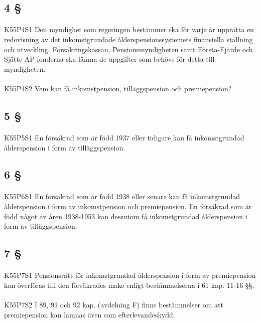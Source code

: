 \documentclass[a4paper,notitlepage,openany,10pt]{book}
\begin{document}
\subsection*{4 §}
\paragraph*{}
{\tiny K55P4S1}
Den myndighet som regeringen bestämmer ska för varje år upprätta en redovisning av det inkomstgrundade ålderspensionssystemets finansiella ställning och utveckling.
Försäkringskassan, Pensionsmyndigheten samt Första-Fjärde och Sjätte AP-fonderna ska lämna de uppgifter som behövs för detta till myndigheten.
\paragraph*{}
{\tiny K55P4S2}
Vem kan få inkomstpension, tilläggspension och premiepension?
\subsection*{5 §}
\paragraph*{}
{\tiny K55P5S1}
En försäkrad som är född 1937 eller tidigare kan få inkomstgrundad ålderspension i form av tilläggspension.
\subsection*{6 §}
\paragraph*{}
{\tiny K55P6S1}
En försäkrad som är född 1938 eller senare kan få inkomstgrundad ålderspension i form av inkomstpension och premiepension. En försäkrad som är född något av åren 1938-1953 kan dessutom få inkomstgrundad ålderspension i form av tilläggspension.
\subsection*{7 §}
\paragraph*{}
{\tiny K55P7S1}
Pensionsrätt för inkomstgrundad ålderspension i form av premiepension kan överföras till den försäkrades make enligt bestämmelserna i 61 kap. 11-16 §§.
\paragraph*{}
{\tiny K55P7S2}
I 89, 91 och 92 kap. (avdelning F) finns bestämmelser om att premiepension kan lämnas även som efterlevandeskydd.
\end{document}
